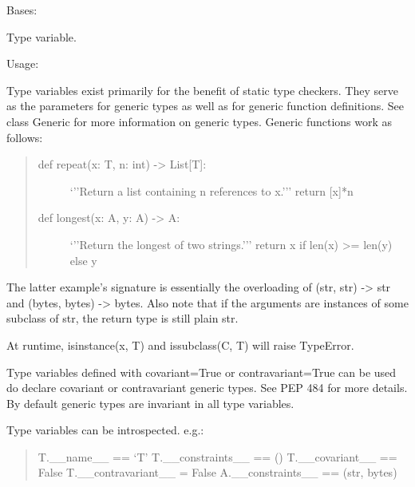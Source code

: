 \documentclass[letterpaper,10pt,english]{sphinxmanual}
\begin{document}
\begin{fulllineitems}
\label{\detokenize{source/md:kubeflow.metadata.metadata.TypeVar}}
Bases: 

Type variable.

Usage:

\begin{sphinxVerbatim}[commandchars=\\\{\}]
    
      
\end{sphinxVerbatim}

Type variables exist primarily for the benefit of static type
checkers.  They serve as the parameters for generic types as well
as for generic function definitions.  See class Generic for more
information on generic types.  Generic functions work as follows:
\begin{quote}
\begin{description}
\item[{def repeat(x: T, n: int) -\textgreater{} List{[}T{]}:}] \leavevmode
‘’’Return a list containing n references to x.’’’
return {[}x{]}*n

\item[{def longest(x: A, y: A) -\textgreater{} A:}] \leavevmode
‘’’Return the longest of two strings.’’’
return x if len(x) \textgreater{}= len(y) else y

\end{description}
\end{quote}

The latter example’s signature is essentially the overloading
of (str, str) -\textgreater{} str and (bytes, bytes) -\textgreater{} bytes.  Also note
that if the arguments are instances of some subclass of str,
the return type is still plain str.

At runtime, isinstance(x, T) and issubclass(C, T) will raise TypeError.

Type variables defined with covariant=True or contravariant=True
can be used do declare covariant or contravariant generic types.
See PEP 484 for more details. By default generic types are invariant
in all type variables.

Type variables can be introspected. e.g.:
\begin{quote}

T.\_\_name\_\_ == ‘T’
T.\_\_constraints\_\_ == ()
T.\_\_covariant\_\_ == False
T.\_\_contravariant\_\_ = False
A.\_\_constraints\_\_ == (str, bytes)
\end{quote}

\end{fulllineitems}
\end{document}
